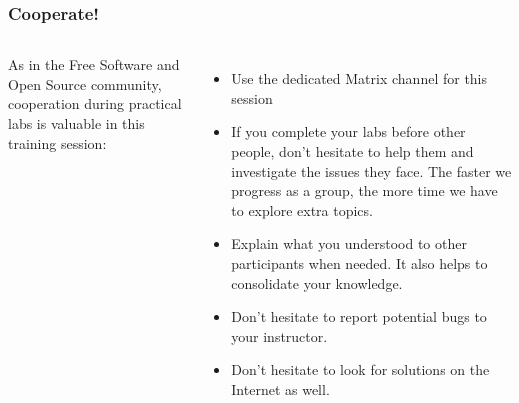 \begin{frame}
\frametitle{Cooperate!}
\begin{columns}
  As in the Free Software and Open Source community,
  cooperation during practical labs is valuable in this training session:
  \begin{itemize}
    \item Use the dedicated Matrix channel for this session
    \item If you complete your labs before other people, don't hesitate to help
          them and investigate the issues they face. The faster we progress as a
          group, the more time we have to explore extra topics.
    \item Explain what you understood to other participants when needed.
          It also helps to consolidate your knowledge.
    \item Don't hesitate to report potential bugs to your instructor.
    \item Don't hesitate to look for solutions on the Internet as well.
    \end{itemize}

\end{columns}
\end{frame}
